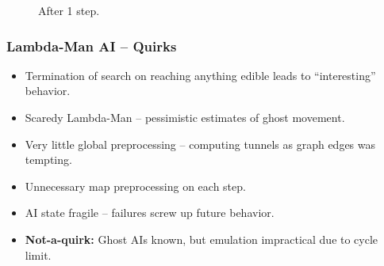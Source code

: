 \documentclass[t,aspectratio=169]{beamer}
\begin{document}
\begin{frame}
\begin{itemize}
{\begin{figure}[!h]
      \caption{After 1 step.}
    \end{figure}}
  \end{itemize}
\end{frame}

\begin{frame}
  \frametitle{Lambda-Man AI -- Quirks}
  \begin{itemize}
    \item Termination of search on reaching anything edible leads to \textquotedblleft{interesting}\textquotedblright{ }behavior.
    \item<2-> Scaredy Lambda-Man -- pessimistic estimates of ghost movement.
    \item<3-> Very little global preprocessing -- computing tunnels as graph edges was tempting.
    \item<4-> Unnecessary map preprocessing on each step.
    \item<5-> AI state fragile -- failures screw up future behavior.\newline
    \item<6-> \textbf{Not-a-quirk:} Ghost AIs known, but emulation impractical due to cycle limit.
  \end{itemize}
\end{frame}
\end{document}
